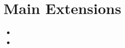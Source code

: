 
\section{\label{main-extensions}Main Extensions}
\begin{itemize}
\item
\par  \item
\par 
\end{itemize}